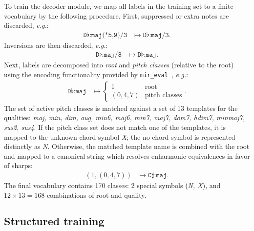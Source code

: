 \documentclass{article}
\def\eg{\emph{e.g.\/}}
\begin{document}
%

To train the decoder module, we map all labels in the training set to a finite vocabulary by the following procedure.
First, suppressed or extra notes are discarded, \eg:
\begin{align*}
    \texttt{D}\flat\texttt{:maj(*5,9)/3} &\mapsto \texttt{D}\flat\texttt{:maj/3}.
\end{align*}
Inversions are then discarded, \eg:
\begin{align*}
    \texttt{D}\flat\texttt{:maj/3} &\mapsto \texttt{D}\flat\texttt{:maj}.
\end{align*}
Next, labels are decomposed into \emph{root} and \emph{pitch classes} (relative to the root) using the encoding functionality provided by \texttt{mir\_eval}~\cite{raffel2014mir_eval}, \eg:
\begin{align*}
    \texttt{D}\flat\texttt{:maj} &\mapsto \begin{cases}
        1 & \text{root}\\
        (0, 4, 7) & \text{pitch classes}
    \end{cases}.
\end{align*}
The set of active pitch classes is matched against a set of 13 templates for the qualities: \emph{maj, min, dim, aug, min6, maj6, min7, maj7, dom7, hdim7, minmaj7, sus2, sus4}.
If the pitch class set does not match one of the templates, it is mapped to the unknown chord symbol \emph{X}; the no-chord symbol is represented distinctly as \emph{N}.
Otherwise, the matched template name is combined with the root and mapped to a canonical string which resolves enharmonic equivalences in favor of sharps:
\begin{align*}
    \left(1, (0, 4, 7) \right) &\mapsto \texttt{C}\sharp\texttt{:maj}.
\end{align*}
The final vocabulary contains 170 classes: 2 special symbols (\emph{N, X}), and $12\times13=168$ combinations of root and quality.


\subsection{Structured training}
\end{document}
